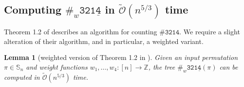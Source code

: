 \documentclass{article}
\newtheorem{lemma}[theorem]{Lemma}
\newcommand{\Sn}{\mathbb{S}_n}
\newcommand{\ZZ}{\mathbb{Z}}
\newcommand{\pce}[1]{{\# \mathtt{#1} }}
\newcommand{\pcw}[2]{{\#_w \mathtt{ #1 } \left( #2 \right)}}
\newcommand{\pcwe}[1]{{\#_w \mathtt{ #1 } }}
\theoremstyle{remark}
\newcommand{\Otilde}[1]{\widetilde{\mathcal{O}}\left( #1 \right)}
\theoremstyle{plain}
\begin{document}
\subsection{Computing \texorpdfstring{$\pcwe{321\underline{4}}$}{\# 3214} in \texorpdfstring{$\Otilde{n^{5/3}}$}{O(n 5/3)} time}
\label{subsect:3214_gadget}

Theorem 1.2 of \cite{even2021counting} describes an algorithm for counting $\pce{3214}$. 
We require a slight alteration of their algorithm, and in particular, a weighted variant.

\begin{lemma} [weighted version of Theorem 1.2 in \cite{even2021counting}]
    Given an input permutation $\pi \in\Sn$ and weight functions $w_1,\ldots,w_4:[n]\to\ZZ$, the tree $\pcw{321\underline{4}}{\pi}$ can be computed in $\Otilde{n^{5/3}}$ time.
\end{lemma}
\end{document}
